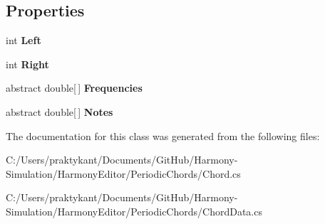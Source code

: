 \subsection*{Properties}
\begin{DoxyCompactItemize}
\item 
\hypertarget{class_periodic_chords_1_1_chord_a37897128af5823d9b357f5cdbe8825e4}{int {\bfseries Left}}\label{class_periodic_chords_1_1_chord_a37897128af5823d9b357f5cdbe8825e4}

\item 
\hypertarget{class_periodic_chords_1_1_chord_ab9bfbd35895915ffc591925be3f0f705}{int {\bfseries Right}}\label{class_periodic_chords_1_1_chord_ab9bfbd35895915ffc591925be3f0f705}

\item 
\hypertarget{class_periodic_chords_1_1_chord_a3d7315c8ee8d5ca4d6bce22c26fe373c}{abstract double\mbox{[}$\,$\mbox{]} {\bfseries Frequencies}}\label{class_periodic_chords_1_1_chord_a3d7315c8ee8d5ca4d6bce22c26fe373c}

\item 
\hypertarget{class_periodic_chords_1_1_chord_a90280465e491db9d40561bfbd941c303}{abstract double\mbox{[}$\,$\mbox{]} {\bfseries Notes}}\label{class_periodic_chords_1_1_chord_a90280465e491db9d40561bfbd941c303}

\end{DoxyCompactItemize}


The documentation for this class was generated from the following files\+:\begin{DoxyCompactItemize}
\item 
C\+:/\+Users/praktykant/\+Documents/\+Git\+Hub/\+Harmony-\/\+Simulation/\+Harmony\+Editor/\+Periodic\+Chords/Chord.\+cs\item 
C\+:/\+Users/praktykant/\+Documents/\+Git\+Hub/\+Harmony-\/\+Simulation/\+Harmony\+Editor/\+Periodic\+Chords/Chord\+Data.\+cs\end{DoxyCompactItemize}
